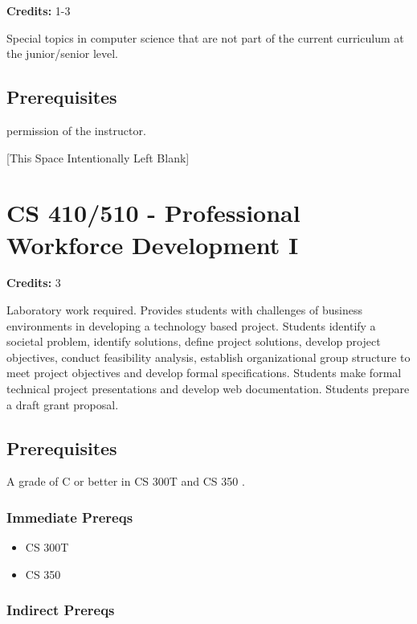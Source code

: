 \documentclass[]{article}
\providecommand{\tightlist}{%
  \setlength{\itemsep}{0pt}\setlength{\parskip}{0pt}}
\newcommand{\pagebreakhere}{
\vspace*{\fill}
\begin{center}
[This Space Intentionally Left Blank]
\end{center}
\vspace*{\fill}
\newpage
}
\begin{document}
\textbf{Credits:} 1-3

Special topics in computer science that are not part of the current
curriculum at the junior/senior level.

\subsection{Prerequisites}\label{prerequisites-25}

permission of the instructor.

\pagebreakhere
\section{CS 410/510 - Professional Workforce Development
I}\label{cs-410510---professional-workforce-development-i}

\textbf{Credits:} 3

Laboratory work required. Provides students with challenges of business
environments in developing a technology based project. Students identify
a societal problem, identify solutions, define project solutions,
develop project objectives, conduct feasibility analysis, establish
organizational group structure to meet project objectives and develop
formal specifications. Students make formal technical project
presentations and develop web documentation. Students prepare a draft
grant proposal.

\subsection{Prerequisites}\label{prerequisites-26}

A grade of C or better in CS 300T and CS 350 .

\subsubsection{Immediate Prereqs}\label{immediate-prereqs-18}

\begin{itemize}
\tightlist
\item
  CS 300T
\item
  CS 350
\end{itemize}

\subsubsection{Indirect Prereqs}\label{indirect-prereqs-18}
\end{document}
